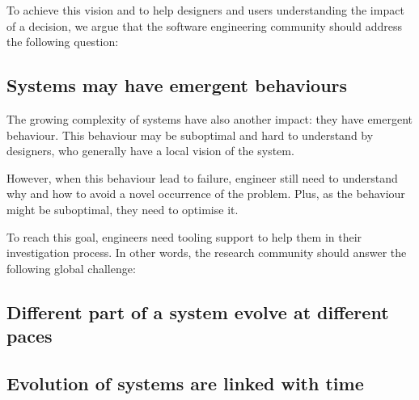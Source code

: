 To achieve this vision and to help designers and users understanding the impact of a decision, we argue that the software engineering community should address the following question:
\vspace{-2em}

\subsection{Systems may have emergent behaviours}
\label{intro:challenges:ermger-bhv}
The growing complexity of systems have also another impact: they have emergent behaviour.
This behaviour may be suboptimal and hard to understand by designers, who generally have a local vision of the system.

However, when this behaviour lead to failure, engineer still need to understand why and how to avoid a novel occurrence of the problem.
Plus, as the behaviour might be suboptimal, they need to optimise it.

To reach this goal, engineers need tooling support to help them in their investigation process.
In other words, the research community should answer the following global challenge:
\vspace{-2em}

\subsection{Different part of a system evolve at different paces}
\label{intro:challenges:diff-paces}

\subsection{Evolution of systems are linked with time}
\label{intro:challenges:evol-syst}

